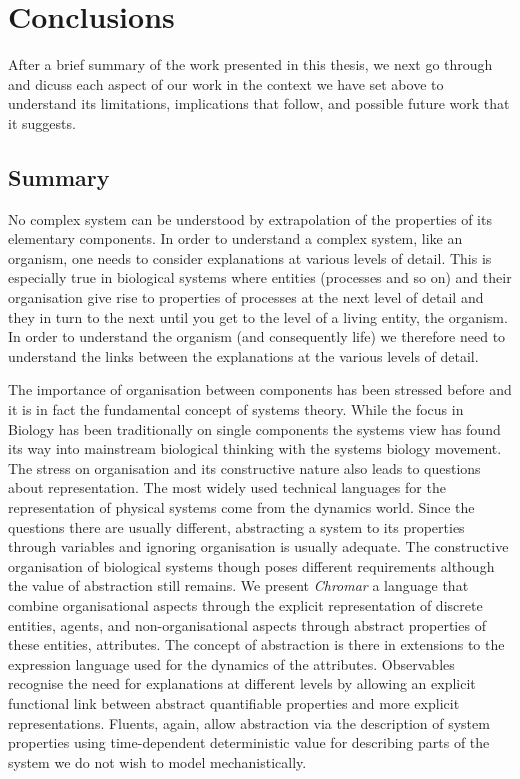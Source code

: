 \documentclass[phd]{infthesis}
\begin{document}
\chapter{Conclusions}
After a brief summary of the work presented in this thesis, we next go
through and dicuss each aspect of our work in the context we have set above to
understand its limitations, implications that follow, and possible future work
that it suggests.

\section{Summary}
No complex system can be understood by extrapolation of the properties of its
elementary components. In order to understand a complex system, like an
organism, one needs to consider explanations at various levels of detail. This
is especially true in biological systems where entities (processes and so on)
and their organisation give rise to properties of processes at the next level of
detail and they in turn to the next until you get to the level of a living
entity, the organism. In order to understand the organism (and consequently
life) we therefore need to understand the links between the explanations at the
various levels of detail.

The importance of organisation between components has been stressed before and
it is in fact the fundamental concept of systems theory. While the focus in
Biology has been traditionally on single components the systems view has found
its way into mainstream biological thinking with the systems biology
movement. The stress on organisation and its constructive nature also leads to
questions about representation. The most widely used technical languages for the
representation of physical systems come from the dynamics world. Since the
questions there are usually different, abstracting a system to its properties
through variables and ignoring organisation is usually adequate. The
constructive organisation of biological systems though poses different
requirements although the value of abstraction still remains. We present
\emph{Chromar} a language that combine organisational aspects through the
explicit representation of discrete entities, agents, and non-organisational
aspects through abstract properties of these entities, attributes. The concept
of abstraction is there in extensions to the expression language used for the
dynamics of the attributes. Observables recognise the need for explanations at
different levels by allowing an explicit functional link between abstract
quantifiable properties and more explicit representations. Fluents, again, allow
abstraction via the description of system properties using time-dependent
deterministic value for describing parts of the system we do not wish to model
mechanistically.
\end{document}
